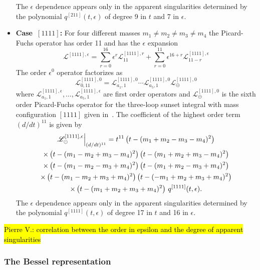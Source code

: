 \documentclass[a4paper,12pt]{article}
\numberwithin{equation}{section}
\numberwithin{figure}{subsection}
\theoremstyle{plain}
\theoremstyle{plain}
\theoremstyle{definition}
\theoremstyle{plain}
\theoremstyle{remark}
\theoremstyle{plain}
\def\su{\circleddash}
\newcommand{\pvnote}[1]{\sethlcolor{bubblegum} \protect\hl{Pierre V.: #1} \sethlcolor{yellow}}
\begin{document}
\begin{itemize}
                 The $\epsilon$ dependence appears only in the
                 apparent singularities determined by the polynomial
                 $q^{[211]}(t,\epsilon)$ of degree 9 in $t$  and 7 in $\epsilon$.
  \item   {\bf Case~$[1111]$:} For four different masses $m_1\neq m_2\neq m_3 \neq m_4$ the
  Picard-Fuchs operator has order 11 and has the $\epsilon$ expansion 
  \begin{equation}
    \mathscr{L}^{[1111],\epsilon}=     \sum_{r=0}^{16}\epsilon^r
    \mathscr{L}^{[1111],r}_{11}+\sum_{r=0}^{11} \epsilon^{16+r}  \mathscr{L}^{[1111],\epsilon}_{11-r}
  \end{equation}
    The order $\epsilon^0$ operator factorizes as
  \begin{equation}
         \mathscr{L}^{[1111],0}_{0,11}=   \mathscr{L}^{[1111],0}_{a_1,1}  \cdots  \mathscr{L}^{[1111],0}_{a_5,1}   \mathscr{L}^{[1111],0}_{\su}
       \end{equation}
        where  $ \mathscr{L}^{[1111],\epsilon}_{a_1,1},\dots,  \mathscr{L}^{[1111],\epsilon}_{a_5,1}$ are  first order operators
       and $\mathscr{L}^{[1111],0}_{\su}$ is the sixth  order  Picard-Fuchs operator for the
       three-loop sunset integral with mass configuration $[1111]$
       given in~\cite{Lairez:2022zkj}.
        The coefficient of the highest order term $(d/dt)^{11}$    is given by
       \begin{multline}
                   \mathscr{L}^{[1111],\epsilon}_\su\Big\vert_{(d/dt)^{11}}=
                   t^{11}\left(t-(m_{1}+m_{2}-m_{3}-m_{4})^2\right) \cr\times
   \left(t-(m_{1}-m_{2}+m_{3}-m_{4})^2\right)
   \left(t-(m_{1}+m_{2}+m_{3}-m_{4})^2\right) \cr\times
   \left(t-(m_{1}-m_{2}-m_{3}+m_{4})^2\right)
   \left(t-(m_{1}+m_{2}-m_{3}+m_{4})^2\right)\cr\times
   \left(t-(m_{1}-m_{2}+m_{3}+m_{4})^2\right)
   \left(t-(-m_{1}+m_{2}+m_{3}+m_{4})^2\right) \cr\times
   \left(t-(m_{1}+m_{2}+m_{3}+m_{4})^2\right)
                   \, q^{[1111]}(t,\epsilon).
                 \end{multline}
                 The $\epsilon$ dependence appears only in the
                 apparent singularities determined by the polynomial
                 $q^{[1111]}(t,\epsilon)$ of degree 17 in
                 $t$ and 16 in $\epsilon$.
     \end{itemize}
\pvnote{correlation between the order in epsilon and the degree of
  apparent singularities}
\subsubsection{The Bessel representation}
\end{document}

